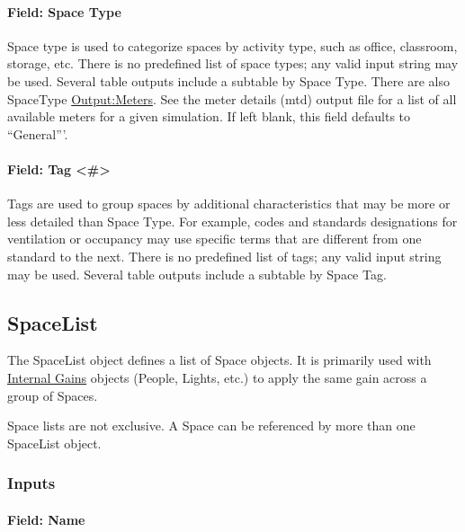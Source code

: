 \paragraph{Field: Space Type}\label{space-type}

Space type is used to categorize spaces by activity type, such as office, classroom, storage, etc. There is no predefined list of space types;
any valid input string may be used. Several table outputs include a subtable by Space Type. There are also SpaceType \hyperref[outputmeter-and-outputmetermeterfileonly]{Output:Meters}. See the meter details (mtd) output file for a list of all available meters for a given simulation.
If left blank, this field defaults to ``General'''.

\paragraph{Field: Tag \textless{}\#\textgreater{}}\label{field-space-tag}

Tags are used to group spaces by additional characteristics that may be more or less detailed than Space Type. For example, codes and standards designations for ventilation or occupancy may use specific terms that are different from one standard to the next. There is no predefined list of tags;
any valid input string may be used. Several table outputs include a subtable by Space Tag.


\subsection{SpaceList}\label{spacelist}

The SpaceList object defines a list of Space objects. It is primarily used with \hyperref[group-internal-gains-people-lights-other-internal-zone-equipment]{Internal Gains} objects (People, Lights, etc.) to apply the same gain across a group of Spaces.

Space lists are not exclusive. A Space can be referenced by more than one SpaceList object.

\subsubsection{Inputs}\label{inputs-1-045space}

\paragraph{Field: Name}\label{field-space-list-name-000}

